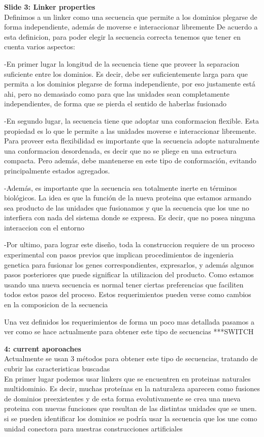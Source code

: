 \documentclass[a4paper,10pt]{article}
\begin{document}
\textbf{Slide 3: Linker properties}\\
Definimos a un linker como una secuencia que permite a los dominios plegarse de forma independiente, además de moverse e interaccionar libremente
De acuerdo a esta definicion, para poder elegir la secuencia correcta tenemos que tener en cuenta varios aspectos:

-En primer lugar la longitud de la secuencia tiene que proveer la separacion suficiente entre los dominios.
Es decir, debe ser suficientemente larga para que permita a los dominios plegarse de forma independiente, por eso justamente está ahi,
pero no demasiado como para que las unidades sean completamente independientes, de forma que se pierda el sentido de haberlas fusionado

-En segundo lugar, la secuencia tiene que adoptar una conformacion flexible. Esta propiedad es lo que le permite a las unidades moverse e interaccionar libremente.
Para proveer esta flexibilidad es importante que la secuencia adopte naturalmente una conformacion desordenada, es decir que no se pliege en una estructura compacta.
Pero además, debe mantenerse en este tipo de conformación, evitando principalmente estados agregados.

-Además, es importante que la secuencia sea totalmente inerte en términos biológicos. 
La idea es que la función de la nueva proteina que estamos armando sea producto de las unidades que fusionamos y que la secuencia que los une no interfiera con nada del sistema donde se expresa.
Es decir, que no posea ninguna interaccion con el entorno

-Por ultimo, para lograr este diseño, toda la construccion requiere de un proceso experimental con pasos previos que implican procedimientos de ingenieria genetica para fusionar los genes correspondientes, expresarlos, 
y además algunos pasos posteriores que puede significar la utilizacion del producto. Como estamos usando una nueva secuencia es normal tener ciertas preferencias que faciliten todos estos pasos del proceso.
Estos requerimientos pueden verse como cambios en la composicion de la secuencia


Una vez definidos los requerimientos de forma un poco mas detallada pasamos a ver como se hace actualmente para obtener este tipo de secuencias ***SWITCH




\textbf{4: current aporoaches}\\
Actualmente se usan 3 métodos para obtener este tipo de secuencias, tratando de cubrir las caracteristicas buscadas\\
En primer lugar podemos usar linkers que se encuentren en proteinas naturales multidominio. 
Es decir, muchas proteínas en la naturaleza aparecen como fusiones de dominios preexistentes y de esta forma evolutivamente se crea una nueva proteina con nuevas funciones que resultan de las distintas unidades que se unen.
si se pueden identificar los dominios se podría usar la secuencia que los une como unidad conectora para nuestras construcciones artificiales
\end{document}
